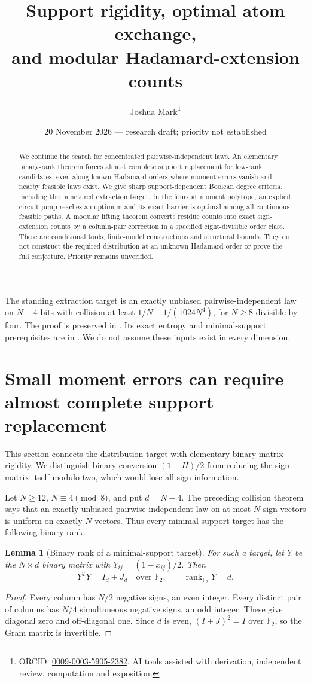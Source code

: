 \documentclass[11pt]{article}
\title{Support rigidity, optimal atom exchange,\\and modular Hadamard-extension counts}
\author{Joshua Mark\thanks{ORCID: \href{https://orcid.org/0009-0003-5905-2382}{0009-0003-5905-2382}. AI tools assisted with derivation, independent review, computation and exposition.}}
\date{20 November 2026 --- research draft; priority not established}
\newtheorem{lemma}[theorem]{Lemma}
\begin{document}
\maketitle

\begin{abstract}
We continue the search for concentrated pairwise-independent laws.
An elementary binary-rank theorem forces almost complete support
replacement for low-rank candidates, even along known Hadamard orders
where moment errors vanish and nearby feasible laws exist. We give
sharp support-dependent Boolean degree criteria, including the
punctured extraction target. In the four-bit moment polytope, an
explicit circuit jump reaches an optimum and its exact barrier is
optimal among all continuous feasible paths. A modular lifting
theorem converts residue counts into exact sign-extension counts by
a column-pair correction in a specified eight-divisible order class.
These are conditional tools, finite-model constructions and structural
bounds. They do not construct the required distribution at an unknown
Hadamard order or prove the full conjecture. Priority remains unverified.
\end{abstract}
The standing extraction target is an exactly unbiased pairwise-independent
law on $N-4$ bits with collision at least $1/N-1/(1024N^4)$, for
$N\ge8$ divisible by four. The proof is preserved in
. Its exact entropy and
minimal-support prerequisites are in
. We do not assume these inputs
exist in every dimension.
\section{Small moment errors can require almost complete support replacement}
\label{sec:rank-rounding}
This section connects the distribution target with elementary binary
matrix rigidity. We distinguish binary conversion $(1-H)/2$ from
reducing the sign matrix itself modulo two, which would lose all
sign information.

Let $N\ge12$, $N\equiv4\pmod8$, and put $d=N-4$. The preceding
collision theorem says that an exactly unbiased pairwise-independent
law on at most $N$ sign vectors is uniform on exactly $N$ vectors.
Thus every minimal-support target has the following binary rank.

\begin{lemma}[Binary rank of a minimal-support target]
\label{lem:rank-target}
For such a target, let $Y$ be the $N\times d$ binary matrix with
$Y_{ij}=(1-x_{ij})/2$. Then
\[
 Y^TY=I_d+J_d\quad\text{over }\mathbb F_2,
 \qquad \operatorname{rank}_{\mathbb F_2}Y=d.
\]
\end{lemma}
\begin{proof}
Every column has $N/2$ negative signs, an even integer. Every distinct
pair of columns has $N/4$ simultaneous negative signs, an odd integer.
These give diagonal zero and off-diagonal one. Since $d$ is even,
$(I+J)^2=I$ over $\mathbb F_2$, so the Gram matrix is invertible.
\end{proof}
\end{document}
